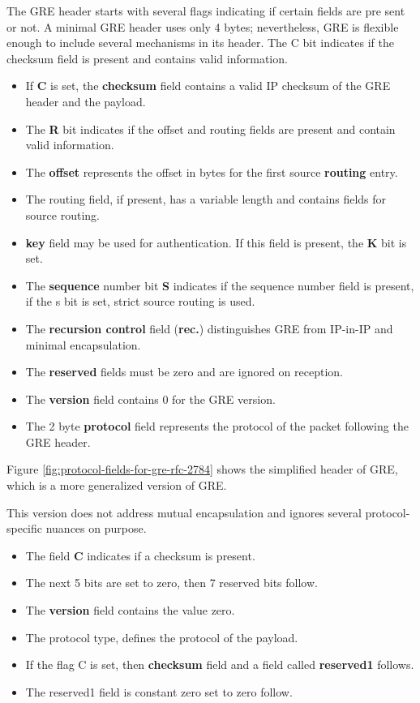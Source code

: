 The GRE header starts with several flags indicating if certain fields are pre sent or not. A minimal GRE header uses only 4 bytes; nevertheless, GRE is
flexible enough to include several mechanisms in its header. The C bit indicates
if the checksum field is present and contains valid information. 
\begin{multicols}{2}
	\begin{itemize}
		\item If \textbf{C} is set, the	\textbf{checksum} field contains a valid IP checksum of the GRE header and the payload. 
		\item The \textbf{R} bit indicates if the offset and routing fields are present and contain	valid information.
		\item The \textbf{offset} represents the offset in bytes for the first source \textbf{routing} entry. 
		\item The routing field, if present, has a variable length and contains fields for source routing.
		\item \textbf{key} field may be used for authentication. If this field is present, the \textbf{K} bit is set.
		\item The \textbf{sequence} number bit \textbf{S} indicates if the sequence number field is present, if the s bit is set, strict source routing is used. 
		\item The \textbf{recursion control} field (\textbf{rec.}) distinguishes GRE from IP-in-IP and minimal encapsulation. 
		\item The \textbf{reserved} fields must be zero and are ignored on reception. 
		\item The \textbf{version} field contains 0 for the GRE version. 
		\item The 2 byte \textbf{protocol} field represents the protocol of the packet following the GRE header. 
	\end{itemize}
\end{multicols}

	
Figure \ref{fig:protocol-fields-for-gre-rfc-2784} shows the simplified header of GRE, which is a more generalized version of GRE.

This version does not address mutual encapsulation and ignores several protocol-specific nuances on purpose. 

\begin{multicols}{2}
	\begin{itemize}
		\item The field \textbf{C} indicates if a checksum is present. 
		\item The next 5 bits are set to zero, then 7 reserved bits follow. 
		\item The \textbf{version} field contains the value zero. 
		\item The protocol type, defines the protocol of the payload. 
		\item If the flag C is set,	then \textbf{checksum} field and a field called \textbf{reserved1} follows. 
		\item The reserved1 field is constant zero set to zero follow.
	\end{itemize}
\end{multicols}

